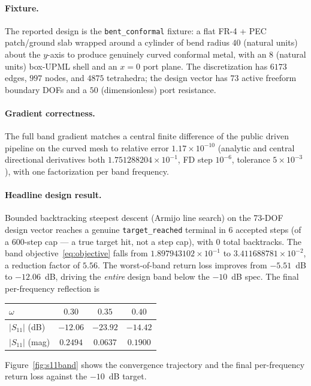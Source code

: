 \documentclass{anvil-paper}
\begin{document}
\paragraph{Fixture.}
The reported design is the \texttt{bent\_conformal} fixture: a flat FR-4 + PEC
patch/ground slab wrapped around a cylinder of bend radius $40$ (natural units)
about the $y$-axis to produce genuinely curved conformal metal, with an $8$
(natural units) box-UPML shell and an $x=0$ port plane. The discretization has
$6173$ edges, $997$ nodes, and $4875$ tetrahedra; the design vector has $73$
active freeform boundary DOFs and a $50$ (dimensionless) port resistance.

\paragraph{Gradient correctness.}
The full band gradient matches a central finite difference of the public driven
pipeline on the curved mesh to relative error $1.17\times10^{-10}$ (analytic and
central directional derivatives both $1.751288204\times10^{-1}$, FD step
$10^{-6}$, tolerance $5\times10^{-3}$), with one factorization per band
frequency.

\paragraph{Headline design result.}
Bounded backtracking steepest descent (Armijo line search) on the 73-DOF design
vector reaches a genuine \texttt{target\_reached} terminal in $6$ accepted
steps (of a $600$-step cap --- a true target hit, not a step cap), with $0$
total backtracks. The band objective~\eqref{eq:objective} falls from
$1.897943102\times10^{-1}$ to $3.411688781\times10^{-2}$, a reduction factor of
$5.56$. The worst-of-band return loss improves from $-5.51$~dB to $-12.06$~dB,
driving the \emph{entire} design band below the $-10$~dB spec. The final
per-frequency reflection is
\begin{center}
\begin{tabular}{lccc}
\toprule
$\omega$ & $0.30$ & $0.35$ & $0.40$ \\
\midrule
$|S_{11}|$ (dB) & $-12.06$ & $-23.92$ & $-14.42$ \\
$|S_{11}|$ (mag) & $0.2494$ & $0.0637$ & $0.1900$ \\
\bottomrule
\end{tabular}
\end{center}
Figure~\ref{fig:s11band} shows the convergence trajectory and the final
per-frequency return loss against the $-10$~dB target.
\end{document}
